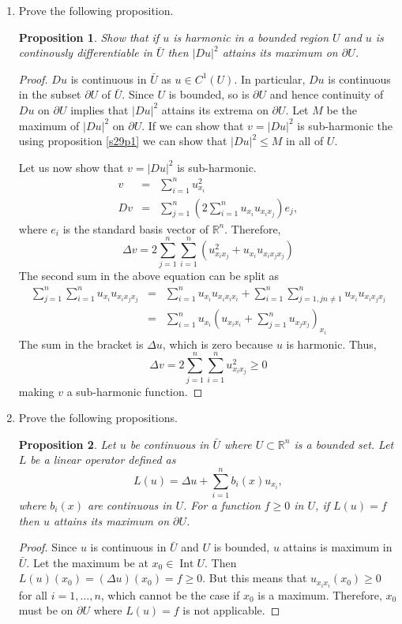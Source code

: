 \documentclass{article}
\DeclareMathOperator*{\Int}{Int}
\theoremstyle{plain}
\numberwithin{thm}{section}
\theoremstyle{plain}
\newtheorem{prop}{Proposition}
\numberwithin{prop}{section}
\theoremstyle{definition}
\numberwithin{defn}{section}
\theoremstyle{remark}
\numberwithin{equation}{section}
\begin{document}
\begin{enumerate}
\item Prove the following proposition.
\begin{prop}\label{s29p3}
Show that if $u$ is harmonic in a bounded region $U$ and $u$ is continously differentiable in $\bar{U}$ then
$|Du|^2$ attains its maximum on $\partial U$.
\end{prop}
\begin{proof}
$Du$ is continuous in $\bar{U}$ as $u \in C^1(U)$. In particular, $Du$ is continuous in the subset 
$\partial U$ of $\bar{U}$. Since $U$ is bounded, so is $\partial U$ and hence continuity of $Du$ on $\partial U$
implies that $|Du|^2$ attains its extrema on $\partial{U}$. Let $M$ be the maximum of $|Du|^2$ on $\partial U$. If
we can show that $v = |Du|^2$ is sub-harmonic the using proposition \ref{s29p1} we can show that $|Du|^2 
\le M$ in all of $U$. 

Let us now show that $v = |Du|^2$ is sub-harmonic.
\begin{eqnarray*}
v &=& \sum_{i=1}^n u_{x_i}^2 \\
Dv &=& \sum_{j=1}^n\left(2\sum_{i=1}^n u_{x_i}u_{x_ix_j}\right)e_j,  
\end{eqnarray*}
where $e_i$ is the standard basis vector of $\mathbb{R}^n$. Therefore,
\[
\Delta v = 2\sum_{j=1}^n\sum_{i=1}^n \left( u_{x_ix_j}^2 + u_{x_i}u_{x_ix_jx_j}\right)
\]
The second sum in the above equation can be split as
\begin{eqnarray*}
\sum_{j=1}^n\sum_{i=1}^n u_{x_i}u_{x_ix_jx_j} &=& 
\sum_{i=1}^n u_{x_i}u_{x_ix_ix_i} + \sum_{i=1}^n\sum_{j=1,j n\ne 1}^n u_{x_i}u_{x_ix_jx_j} \\
&=& \sum_{i=1}^n u_{x_i}\left(u_{x_ix_i} + \sum_{j=1}^n u_{x_jx_j}\right)_{x_i}
\end{eqnarray*}
The sum in the bracket is $\Delta u$, which is zero because $u$ is harmonic. Thus,
\[
\Delta v = 2\sum_{j=1}^n\sum_{i=1}^n u_{x_ix_j}^2 \ge 0
\]
making $v$ a sub-harmonic function.
\end{proof}

\item Prove the following propositions.
\begin{prop}\label{s29p4}
Let $u$ be continuous in $\bar{U}$ where $U \subset \mathbb{R}^n$ is a bounded set. Let $L$ be a linear operator
defined as 
\begin{equation}\label{s29e11}
L(u) = \Delta u + \sum_{i=1}^n b_i(x)u_{x_i},
\end{equation}
where $b_i(x)$ are continuous in $U$. For a function $f \ge 0$ in $U$, if $L(u) = f$ then $u$ attains its
maximum on $\partial U$.
\end{prop}
\begin{proof}
Since $u$ is continuous in $\bar{U}$ and $U$ is bounded, $u$ attains is maximum in $\bar{U}$. Let the maximum
be at $x_0 \in \Int U$. Then $L(u)(x_0) = (\Delta u)(x_0) = f \ge 0$. But this means that $u_{x_ix_i}(x_0) \ge 0$ 
for all $i = 1, \ldots, n$, which cannot be the case if $x_0$ is a maximum. Therefore, $x_0$ must be on 
$\partial U$ where $L(u) = f$ is not applicable.
\end{proof}


\end{enumerate}
\end{document}
